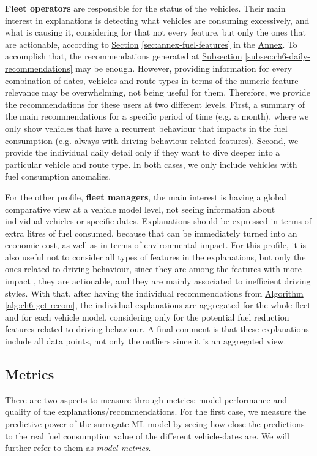 \textbf{Fleet operators} are responsible for the status of the vehicles. Their main interest in explanations is detecting what vehicles are consuming excessively, and what is causing it, considering for that not every feature, but only the ones that are actionable, according to \hyperref[sec:annex-fuel-features]{Section} \ref{sec:annex-fuel-features} in the \hyperref[ch:annex]{Annex}. To accomplish that, the recommendations generated at \hyperref[subsec:ch6-daily-recommendations]{Subsection} \ref{subsec:ch6-daily-recommendations} may be enough. However, providing information for every combination of dates, vehicles and route types in terms of the numeric feature relevance may be overwhelming, not being useful for them. Therefore, we provide the recommendations for these users at two different levels. First, a summary of the main recommendations for a specific period of time (e.g. a month), where we only show vehicles that have a recurrent behaviour that impacts in the fuel consumption (e.g. always with driving behaviour related features). Second, we provide the individual daily detail only if they want to dive deeper into a particular vehicle and route type. In both cases, we only include vehicles with fuel consumption anomalies.

For the other profile, \textbf{fleet managers}, the main interest is having a global comparative view at a vehicle model level, not seeing information about individual vehicles or specific dates. Explanations should be expressed in terms of extra litres of fuel consumed, because that can be immediately turned into an economic cost, as well as in terms of environmental impact. For this profile, it is also useful not to consider all types of features in the explanations, but only the ones related to driving behaviour, since they are among the features with more impact \parencite{zacharof2016review}, they are actionable, and they are mainly associated to inefficient driving styles.
With that, after having the individual recommendations from \hyperref[alg:ch6-get-recom]{Algorithm} \ref{alg:ch6-get-recom}, the individual explanations are aggregated for the whole fleet and for each vehicle model, considering only for the potential fuel reduction features related to driving behaviour. A final comment is that these explanations include all data points, not only the outliers since it is an aggregated view.

\subsection{Metrics}\label{subsec:ch6-metrics}
There are two aspects to measure through metrics: model performance and quality of the explanations/recommendations. For the first case, we measure the predictive power of the surrogate ML model by seeing how close the predictions to the real fuel consumption value of the different vehicle-dates are. We will further refer to them as \textit{model metrics}. 

